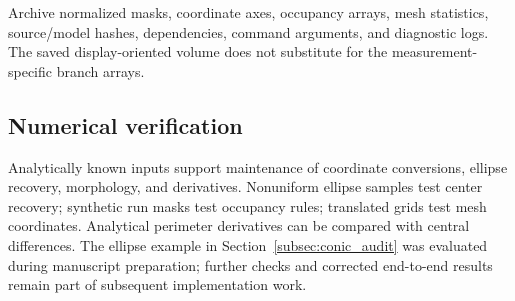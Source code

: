 \documentclass[11pt,a4paper]{article}
\numberwithin{equation}{section}
\begin{document}
Archive normalized masks, coordinate axes, occupancy arrays, mesh statistics, source/model hashes, dependencies, command arguments, and diagnostic logs. The saved display-oriented volume does not substitute for the measurement-specific branch arrays.

\subsection{Numerical verification}
Analytically known inputs support maintenance of coordinate conversions, ellipse recovery, morphology, and derivatives. Nonuniform ellipse samples test center recovery; synthetic run masks test occupancy rules; translated grids test mesh coordinates. Analytical perimeter derivatives can be compared with central differences. The ellipse example in Section~\ref{subsec:conic_audit} was evaluated during manuscript preparation; further checks and corrected end-to-end results remain part of subsequent implementation work.
\end{document}
